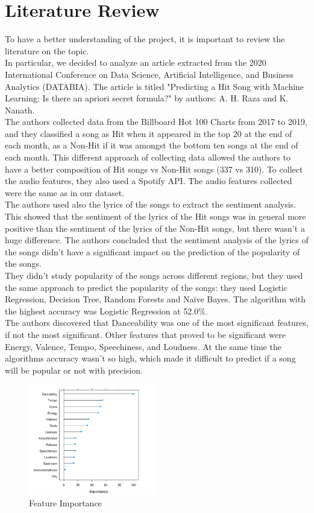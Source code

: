 \chapter{Literature Review}

To have a better understanding of the project, it is important to review the literature on the topic.\\
In particular, we decided to analyze an article extracted from the 2020 International Conference on Data Science, Artificial Intelligence, and Business Analytics (DATABIA). The article is titled "Predicting a Hit Song with Machine Learning: Is there an apriori secret formula?" by authors: A. H. Raza and K. Nanath. \\
The authors collected data from the Billboard Hot 100 Charts from 2017 to 2019, and they classified a song as Hit when it appeared in the top 20 at the end of each month, as a Non-Hit if it was amongst the bottom ten songs at the end of each month.
This different approach of collecting data allowed the authors to have a better composition of Hit songs vs Non-Hit songs (337 vs 310). To collect the audio features, they also used a Spotify API. The audio features collected were the same as in our dataset. \\
The authors used also the lyrics of the songs to extract the sentiment analysis. This showed that the sentiment of the lyrics of the Hit songs was in general more positive than the sentiment of the lyrics of the Non-Hit songs, but there wasn't a huge difference. The authors concluded that the sentiment analysis of the lyrics of the songs didn't have a significant impact on the prediction of the popularity of the songs. \\
They didn't study popularity of the songs across different regions, but they used the same approach to predict the popularity of the songs: they used Logistic Regression, Decision Tree, Random Forests and Naïve Bayes.
The algorithm with the highest accuracy was Logistic Regression at 52.0\%. \\
The authors discovered that Danceability was one of the most significant features, if not the most significant. Other features that proved to be significant were Energy, Valence, Tempo, Speechiness, and Loudness. At the same time the algorithms accuracy wasn't so high, which made it difficult to predict if a song will be popular or not with precision. \\

\begin{figure} [H]
    \centering
    \includegraphics[width=0.5\textwidth]{media/state_of_art_feat_imp.png}
    \caption{Feature Importance}
    \label{fig:feature_importance}
\end{figure}